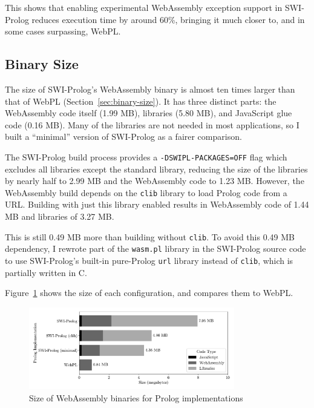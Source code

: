 This shows that enabling experimental WebAssembly exception support in SWI-Prolog reduces execution time by around 60\%, bringing it much closer to, and in some cases surpassing, WebPL.

\subsection{Binary Size}

\label{sec:binary-size-opt}

The size of SWI-Prolog's WebAssembly binary is almost ten times larger than that of WebPL (Section~\ref{sec:binary-size}). It has three distinct parts: the WebAssembly code itself (1.99 MB), libraries (5.80 MB), and JavaScript glue code (0.16 MB). Many of the libraries are not needed in most applications, so I built a ``minimal'' version of SWI-Prolog as a fairer comparison.

The SWI-Prolog build process provides a \texttt{-DSWIPL-PACKAGES=OFF} flag which excludes all libraries except the standard library, reducing the size of the libraries by nearly half to 2.99 MB and the WebAssembly code to 1.23 MB. However, the WebAssembly build depends on the \texttt{clib} library to load Prolog code from a URL. Building with just this library enabled results in WebAssembly code of 1.44 MB and libraries of 3.27 MB.

This is still 0.49 MB more than building without \texttt{clib}. To avoid this 0.49 MB dependency, I rewrote part of the \texttt{wasm.pl} library in the SWI-Prolog source code to use SWI-Prolog's built-in pure-Prolog \texttt{url} library instead of \texttt{clib}, which is partially written in C.

Figure~\ref{fig:binary-size} shows the size of each configuration, and compares them to WebPL.

\begin{figure}[H]
\centering
\includegraphics[width=0.8\textwidth]{binary_size.pdf}
\caption{Size of WebAssembly binaries for Prolog implementations}
\label{fig:binary-size}
\end{figure}

